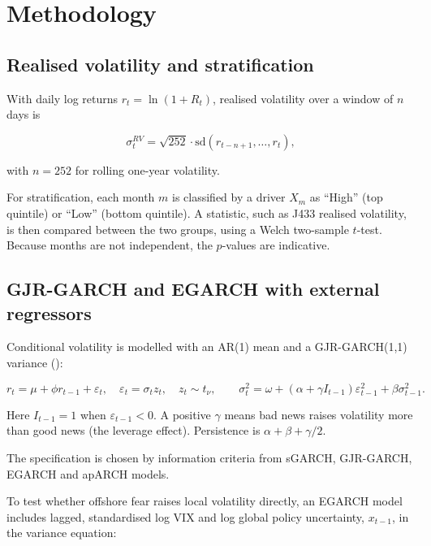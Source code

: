 \documentclass[11pt,preprint]{elsarticle}
\numberwithin{equation}{section}
\numberwithin{figure}{section}
\numberwithin{table}{section}
\begin{document}
\section{\texorpdfstring{Methodology
\label{Method}}{Methodology }}\label{methodology}

\subsection{Realised volatility and
stratification}\label{realised-volatility-and-stratification}

With daily log returns \(r_t = \ln(1+R_t)\), realised volatility over a
window of \(n\) days is

\[
\sigma^{RV}_t = \sqrt{252}\cdot \text{sd}(r_{t-n+1},\dots,r_t),
\]

with \(n = 252\) for rolling one-year volatility.

For stratification, each month \(m\) is classified by a driver \(X_m\)
as ``High'' (top quintile) or ``Low'' (bottom quintile). A statistic,
such as J433 realised volatility, is then compared between the two
groups, using a Welch two-sample \(t\)-test. Because months are not
independent, the \(p\)-values are indicative.

\subsection{GJR-GARCH and EGARCH with external
regressors}\label{gjr-garch-and-egarch-with-external-regressors}

Conditional volatility is modelled with an AR(1) mean and a
GJR-GARCH(1,1) variance
():

\[
r_t = \mu + \phi r_{t-1} + \varepsilon_t,\quad \varepsilon_t = \sigma_t z_t,\quad z_t \sim t_\nu,
\qquad
\sigma_t^2 = \omega + (\alpha + \gamma I_{t-1})\varepsilon_{t-1}^2 + \beta\sigma_{t-1}^2.
\]

Here \(I_{t-1} = 1\) when \(\varepsilon_{t-1} < 0\). A positive
\(\gamma\) means bad news raises volatility more than good news (the
leverage effect). Persistence is \(\alpha + \beta + \gamma/2\).

The specification is chosen by information criteria from sGARCH,
GJR-GARCH, EGARCH and apARCH models.

To test whether offshore fear raises local volatility directly, an
EGARCH model includes lagged, standardised log VIX and log global policy
uncertainty, \(x_{t-1}\), in the variance equation:
\end{document}
